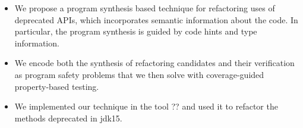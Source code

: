 \documentclass[sigconf,review,anonymous]{acmart}
\begin{document}
\begin{itemize}

\item We propose a program synthesis based technique for refactoring uses of deprecated APIs, which incorporates semantic information about the code. In particular, the program synthesis is guided by code hints and type information.

\item We encode both the synthesis of refactoring candidates and their verification as program safety problems that we then solve with coverage-guided property-based testing.

  
  
  


\item We implemented our technique in the tool ?? and used it to refactor the methods deprecated in jdk15.
  
\end{itemize}  

%
\end{document}
